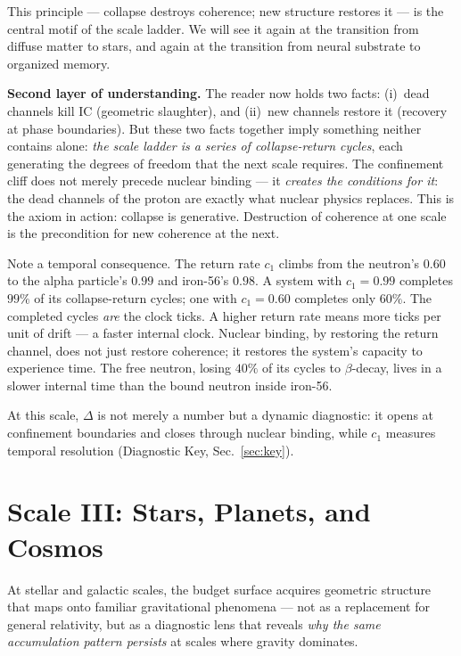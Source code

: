 \documentclass[
  aps,
  prd,
  twocolumn,
  superscriptaddress,
  nofootinbib,
  floatfix
]{revtex4-2}
\newcommand{\IC}{\mathrm{IC}}
\begin{document}
This principle --- collapse destroys coherence;
new structure restores it --- is the central motif of the
scale ladder.  We will see it again at the transition from
diffuse matter to stars, and again at the transition from
neural substrate to organized memory.

\textbf{Second layer of understanding.}
The reader now holds two facts: (i)~dead channels kill $\IC$
(geometric slaughter), and (ii)~new channels restore it
(recovery at phase boundaries).  But these two facts together
imply something neither contains alone: \emph{the scale ladder
is a series of collapse-return cycles}, each generating
the degrees of freedom that the next scale requires.  The
confinement cliff does not merely precede nuclear binding ---
it \emph{creates the conditions for it}: the dead channels of
the proton are exactly what nuclear physics replaces.  This is
the axiom in action: collapse is generative.  Destruction of
coherence at one scale is the precondition for new coherence
at the next.

Note a temporal consequence.  The return rate $c_1$ climbs
from the neutron's $0.60$ to the alpha particle's $0.99$ and
iron-56's $0.98$.  A system with $c_1 = 0.99$ completes
$99\%$ of its collapse-return cycles; one with $c_1 = 0.60$
completes only $60\%$.  The completed cycles \emph{are}
the clock ticks.  A higher return rate means more ticks per
unit of drift --- a faster internal clock.  Nuclear binding,
by restoring the return channel, does not just restore
coherence; it restores the system's capacity to experience
time.  The free neutron, losing $40\%$ of its cycles to
$\beta$-decay, lives in a slower internal time than the
bound neutron inside iron-56.

At this scale, $\Delta$ is not merely a number but a
dynamic diagnostic: it opens at confinement boundaries and
closes through nuclear binding, while $c_1$ measures
temporal resolution (Diagnostic Key, Sec.~\ref{sec:key}).


\section{Scale III: Stars, Planets, and Cosmos}
\label{sec:cosmos}

At stellar and galactic scales, the budget surface acquires
geometric structure that maps onto familiar gravitational
phenomena --- not as a replacement for general relativity,
but as a diagnostic lens that reveals \emph{why the same
accumulation pattern persists} at scales where gravity
dominates.
\end{document}
